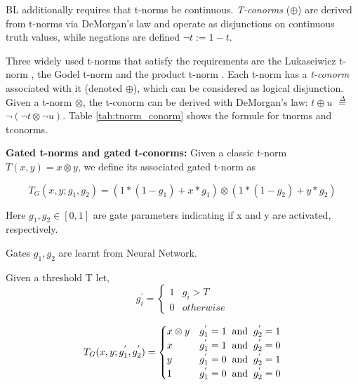 \noindent BL additionally requires that t-norms be continuous. \textit{T-conorms} ($\oplus$) are derived from t-norms via DeMorgan’s law and operate as disjunctions on continuous truth values, while negations are defined $\neg{t} := 1 - t$.

\noindent Three widely used t-norms that satisfy the requirements are the
Lukaseiwicz t-norm \cite{luka}, the Godel t-norm \cite{baaz1996} and the product t-norm \cite{hajek1996}. Each t-norm has a \textit{t-conorm} associated with it (denoted $\oplus$), which can be
considered as logical disjunction. Given a t-norm $\otimes$, the t-conorm can be derived with DeMorgan’s
law: $t \oplus u$ $\overset{\Delta}{=}$ $\neg{(\neg{t} \otimes \neg{u})}$. Table \ref{tab:tnorm_conorm} shows the formule for tnorms and tconorms.



\noindent\textbf{Gated t-norms and gated t-conorms:} Given a classic t-norm $T(x, y) = x \otimes y$, we define its associated gated t-norm as 

$$T_{G}(x,y;g_{1},g_{2}) = (1*(1 - g_{1}) + x*g_{1}) \otimes (1*(1 - g_{2}) + y*g_{2})$$

Here $g_{1}, g_{2} \in [0, 1]$ are gate parameters indicating if x and y are activated, respectively.

Gates $g_{1}, g_{2}$ are learnt from Neural Network.

\noindent Given a threshold T let,
\[
    g_{i}^{'} =
    \begin{cases}
        1 & g_{i} > T\\
        0 & otherwise
    \end{cases}    
\]

\[\label{def}
    T_{G}(x,y;g_{1}^{'},g_{2}^{'})= 
\begin{cases}
    x \otimes y & g_{1}^{'} = 1 \hspace{2mm} \text{and} \hspace{2mm} g_{2}^{'} = 1\\
    x & g_{1}^{'} = 1 \hspace{2mm} \text{and} \hspace{2mm} g_{2}^{'} = 0\\
    y & g_{1}^{'} = 0 \hspace{2mm} \text{and} \hspace{2mm} g_{2}^{'} = 1\\
    1 & g_{1}^{'} = 0 \hspace{2mm} \text{and} \hspace{2mm} g_{2}^{'} = 0
\end{cases}
\]

